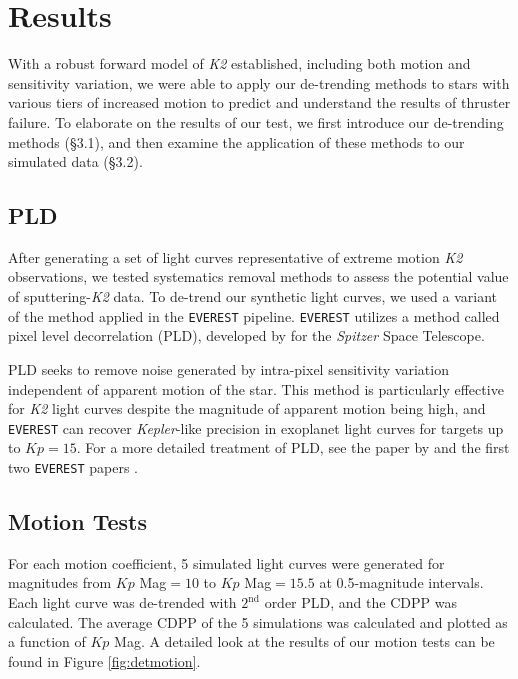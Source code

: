 \documentclass[12pt,preprint]{aastex}
\begin{document}
\section{Results}

With a robust forward model of \textit{K2} established, including both motion and sensitivity variation, we were able to apply our de-trending methods to stars with various tiers of increased motion to predict and understand the results of thruster failure. To elaborate on the results of our test, we first introduce our de-trending methods (\S 3.1), and then examine the application of these methods to our simulated data (\S 3.2). 

\subsection{PLD}

After generating a set of light curves representative of extreme motion \textit{K2} observations, we tested systematics removal methods to assess the potential value of sputtering-\textit{K2} data. To de-trend our synthetic light curves, we used a variant of the method applied in the \texttt{EVEREST} pipeline. \texttt{EVEREST} utilizes a method called pixel level decorrelation (PLD), developed by \cite{0004-637X-805-2-132} for the \textit{Spitzer} Space Telescope.

PLD seeks to remove noise generated by intra-pixel sensitivity variation independent of apparent motion of the star. This method is particularly effective for \textit{K2} light curves despite the magnitude of apparent motion being high, and \texttt{EVEREST} can recover \textit{Kepler}-like precision in exoplanet light curves for targets up to $Kp = 15$. For a more detailed treatment of PLD, see the paper by \cite{0004-637X-805-2-132} and the first two \texttt{EVEREST} papers \citep{2016AJ....152..100L,2017arXiv170205488L}.

\subsection{Motion Tests}

For each motion coefficient, 5 simulated light curves were generated for magnitudes from $Kp$ Mag$=10$ to $Kp$ Mag$=15.5$ at 0.5-magnitude intervals. Each light curve was de-trended with $2^{\text{nd}}$ order PLD, and the CDPP was calculated. The average CDPP of the 5 simulations was calculated and plotted as a function of $Kp$ Mag. A detailed look at the results of our motion tests can be found in Figure \ref{fig:detmotion}.
\end{document}
